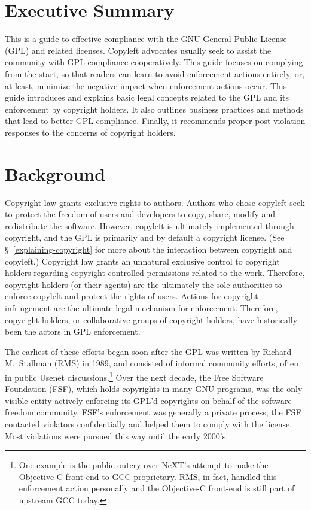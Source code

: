 \pagebreak

\chapter*{Executive Summary}

This is a guide to effective compliance with the GNU General Public
License (GPL) and related licenses.  Copyleft advocates
usually seek to assist the community with
GPL compliance cooperatively.   This guide focuses on complying from the
start, so that readers can learn to avoid enforcement actions entirely, or, at
least, minimize  the negative impact when enforcement actions occur.
This guide  introduces and explains basic legal concepts related to the GPL and its
enforcement by copyright holders. It also outlines business practices and
methods that lead to better GPL compliance.  Finally, it recommends proper
post-violation responses to the concerns of copyright holders.

\chapter{Background}

Copyright law grants exclusive rights to authors.  Authors who chose copyleft
seek to protect the freedom of users and developers to copy, share, modify
and redistribute the software.  However, copyleft is ultimately implemented
through copyright, and the GPL is primarily and by default a copyright
license.  (See \S~\ref{explaining-copyright} for more about the interaction
between copyright and copyleft.)  Copyright law grants an unnatural exclusive
control to copyright holders regarding copyright-controlled permissions
related to the work.  Therefore, copyright holders (or their agents) are the
ultimately the sole authorities to enforce copyleft and protect the rights of
users.  Actions for copyright infringement are the ultimate legal mechanism
for enforcement.  Therefore, copyright holders, or collaborative groups of
copyright holders, have historically been the actors in GPL enforcement.

The earliest of these efforts began soon after the GPL was written by
Richard M.~Stallman (RMS) in 1989, and consisted of informal community efforts,
often in public Usenet discussions.\footnote{One example is the public
  outcry over NeXT's attempt to make the Objective-C front-end to GCC
  proprietary.  RMS, in fact, handled this enforcement action personally and
  the Objective-C front-end is still part of upstream GCC today.}  Over the next decade, the Free Software Foundation (FSF),
which holds copyrights in many GNU programs, was the only visible entity
actively enforcing its GPL'd copyrights on behalf of the software freedom
community.
FSF's enforcement
was generally a private process; the FSF contacted violators
confidentially and helped them to comply with the license.  Most
violations were pursued this way until the early 2000's.

